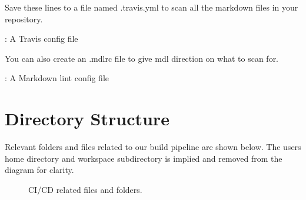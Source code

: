 Save these lines to a file named .travis.yml to scan all the markdown files in your repository.

\justify
\begin{mybox}{\thetcbcounter: A Travis config file}
	
\end{mybox}

\justify
You can also create an .mdlrc file to give mdl direction on what to scan for.

\justify
\begin{mybox}{\thetcbcounter: A Markdown lint config file}
	
\end{mybox}

\clearpage

\section{Directory Structure}

\justify
Relevant folders and files related to our build pipeline are shown below. The users home directory
and workspace subdirectory is implied and removed from the diagram for clarity.

\begin{figure}[!htb]
	
	\caption{CI/CD related files and folders.}
\end{figure}
